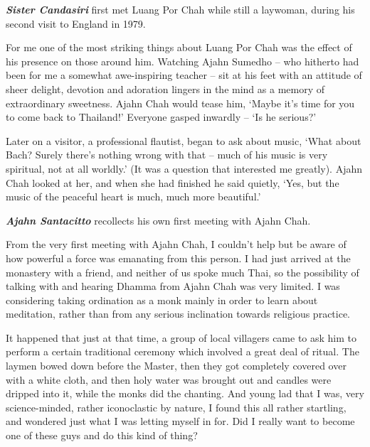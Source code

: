 \textbf{\emph{Sister Candasiri}} first met Luang Por Chah while still a
laywoman, during his second visit to England in 1979.

For me one of the most striking things about Luang Por Chah was the
effect of his presence on those around him. Watching Ajahn Sumedho --
who hitherto had been for me a somewhat awe-inspiring teacher -- sit at
his feet with an attitude of sheer delight, devotion and adoration
lingers in the mind as a memory of extraordinary sweetness. Ajahn Chah
would tease him, `Maybe it's time for you to come back to Thailand!'
Everyone gasped inwardly -- `Is he serious?'

Later on a visitor, a professional flautist, began to ask about music,
`What about Bach? Surely there's nothing wrong with that -- much of his
music is very spiritual, not at all worldly.' (It was a question that
interested me greatly). Ajahn Chah looked at her, and when she had
finished he said quietly, `Yes, but the music of the peaceful heart is
much, much more beautiful.'

\textbf{\emph{Ajahn Santacitto}} recollects his own first meeting with
Ajahn Chah.

From the very first meeting with Ajahn Chah, I couldn't help but be
aware of how powerful a force was emanating from this person. I had just
arrived at the monastery with a friend, and neither of us spoke much
Thai, so the possibility of talking with and hearing Dhamma from Ajahn
Chah was very limited. I was considering taking ordination as a monk
mainly in order to learn about meditation, rather than from any serious
inclination towards religious practice.

It happened that just at that time, a group of local villagers came to
ask him to perform a certain traditional ceremony which involved a great
deal of ritual. The laymen bowed down before the Master, then they got
completely covered over with a white cloth, and then holy water was
brought out and candles were dripped into it, while the monks did the
chanting. And young lad that I was, very science-minded, rather
iconoclastic by nature, I found this all rather startling, and wondered
just what I was letting myself in for. Did I really want to become one
of these guys and do this kind of thing?

